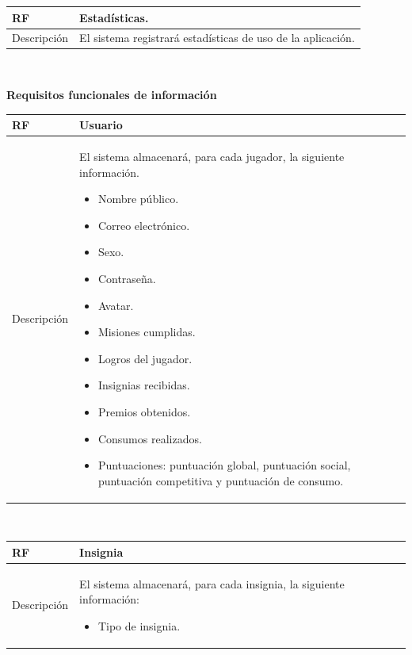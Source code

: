 \documentclass[twoside]{report}
\newcommand\addrow[2]{#1 &#2\\ }
\newcommand\addheading[2]{#1 &#2\\ \hline}
\newcommand\tabularhead{\begin{tabular}{lp{0.7\textwidth}}
\hline
}
\newenvironment{req}{\tabularhead}
{\hline\end{tabular}}
\begin{document}
\vspace{0.25cm}

\begin{req}
	\addheading{\textbf{RF\arabic{functionalRequirements}}}{Estadísticas.}
	\addrow{Descripción}{El sistema registrará estadísticas de uso de la aplicación.}
\end{req}\\

\vspace{1cm}

\textbf{Requisitos funcionales de información}\\

\begin{req}
	\addheading{\textbf{RF\arabic{functionalRequirements}}}{Usuario}
	\addrow{Descripción}{
	El sistema almacenará, para cada jugador, la siguiente información.
	\begin{multicols}{2}
	\begin{itemize}
		\item Nombre público.
		\item Correo electrónico.
		\item Sexo.
		\item Contraseña.
		\item Avatar.
		\item Misiones cumplidas.
		\item Logros del jugador.
		\item Insignias recibidas.
		\item Premios obtenidos.
		\item Consumos realizados.
		\item Puntuaciones: puntuación global, puntuación social, puntuación competitiva y puntuación de consumo.
	\end{itemize}
	\end{multicols}
	}
\end{req}\\

\vspace{0.25cm}

\begin{req}
	\addheading{\textbf{RF\arabic{functionalRequirements}}}{Insignia}
	\addrow{Descripción}{
	El sistema almacenará, para cada insignia, la siguiente información:
	\begin{multicols}{2}
	\begin{itemize}
		\item Tipo de insignia.
	\end{itemize}
	\end{multicols}
	}
\end{req}\\
\end{document}

